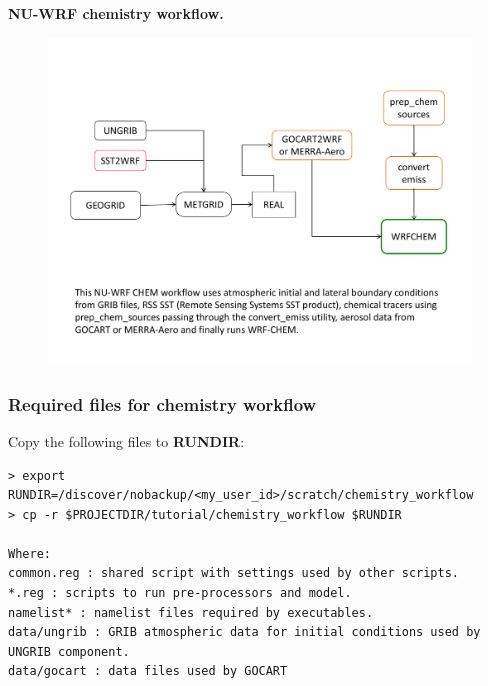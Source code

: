 \begin{frame}

\centering
\textbf{NU-WRF chemistry workflow.}
\begin{figure}[t]
\centering
\includegraphics[scale=.4]{chemistry-workflow-1.pdf}
\end{figure}

\end{frame}

\begin{frame}[fragile]\frametitle{Required files for chemistry workflow}

Copy the following files to \textbf{RUNDIR}:
\begin{lstlisting}
> export RUNDIR=/discover/nobackup/<my_user_id>/scratch/chemistry_workflow
> cp -r $PROJECTDIR/tutorial/chemistry_workflow $RUNDIR

Where:
common.reg : shared script with settings used by other scripts.
*.reg : scripts to run pre-processors and model.
namelist* : namelist files required by executables.
data/ungrib : GRIB atmospheric data for initial conditions used by UNGRIB component.
data/gocart : data files used by GOCART
\end{lstlisting}

\end{frame}

